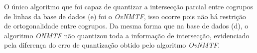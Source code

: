 \documentclass[
    12pt,                %
    oneside,            %
    a4paper,            %
    english,            %
    brazil                %
    ]{abntex2ppgsi}
\begin{document}
O único algoritmo que foi capaz de quantizar a intersecção parcial entre cogrupos de linhas da base de dados (e) foi o \textit{OvNMTF}, isso ocorre pois não há restrição de ortogonalidade entre cogrupos.
Da mesma forma que na base de dados (d), o algoritmo \textit{ONMTF} não quantizou toda a informação de intersecção, evidenciado pela diferença do erro de quantização obtido pelo algoritmo \textit{OvNMTF}.




\end{document}
